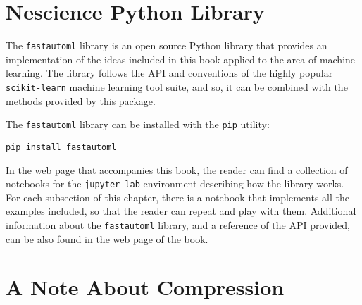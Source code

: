 %
%

\section{Nescience Python Library}

The \texttt{fastautoml} library is an open source Python library that provides an implementation of the ideas included in this book applied to the area of machine learning. The library follows the API and conventions of the highly popular \texttt{scikit-learn} machine learning tool suite, and so, it can be combined with the methods provided by this package.

The \texttt{fastautoml} library can be installed with the \texttt{pip} utility:

\begin{sourcecode}
{\scriptsize \begin{verbatim}
pip install fastautoml
\end{verbatim}}
\end{sourcecode}

In the web page that accompanies this book, the reader can find a collection of notebooks for the \texttt{jupyter-lab} environment describing how the library works. For each subsection of this chapter, there is a notebook that implements all the examples included, so that the reader can repeat and play with them. Additional information about the \texttt{fastautoml} library, and a reference of the API provided, can be also found in the web page of the book.

%
%
\section{A Note About Compression}
\label{sec:note_about_compression}

